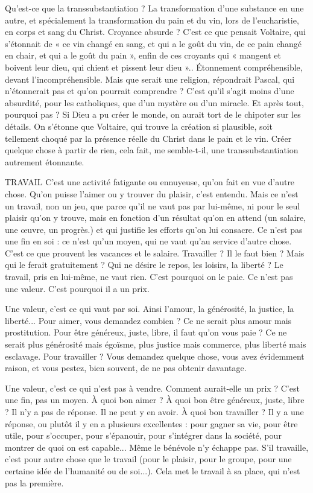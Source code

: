 Qu'est-ce que la transsubstantiation ? La transformation d’une substance
en une autre, et spécialement la transformation du pain et du vin, lors de
l'eucharistie, en corps et sang du Christ. Croyance absurde ? C’est ce que pensait
Voltaire, qui s’étonnait de « ce vin changé en sang, et qui a le goût du vin,
de ce pain changé en chair, et qui a le goût du pain », enfin de ces croyants qui
« mangent et boivent leur dieu, qui chient et pissent leur dieu ».. Étonnement
compréhensible, devant l’incompréhensible. Mais que serait une religion,
répondrait Pascal, qui n’étonnerait pas et qu’on pourrait comprendre ? C’est
qu'il s’agit moins d’une absurdité, pour les catholiques, que d’un mystère ou
d’un miracle. Et après tout, pourquoi pas ? Si Dieu a pu créer le monde, on
aurait tort de le chipoter sur les détails. On s’étonne que Voltaire, qui trouve la
création si plausible, soit tellement choqué par la présence réelle du Christ dans
le pain et le vin. Créer quelque chose à partir de rien, cela fait, me semble-t-il,
une transsubstantiation autrement étonnante.

TRAVAIL C’est une activité fatigante ou ennuyeuse, qu’on fait en vue d’autre
chose. Qu’on puisse l’aimer ou y trouver du plaisir, c’est entendu.
Mais ce n’est un travail, non un jeu, que parce qu’il ne vaut pas par lui-même,
ni pour le seul plaisir qu’on y trouve, mais en fonction d’un résultat qu’on en
attend (un salaire, une œuvre, un progrès.) et qui justifie les efforts qu’on lui
consacre. Ce n’est pas une fin en soi : ce n’est qu’un moyen, qui ne vaut qu’au
service d’autre chose. C’est ce que prouvent les vacances et le salaire.
Travailler ? Il le faut bien ? Mais qui le ferait gratuitement ? Qui ne désire le
repos, les loisirs, la liberté ? Le travail, pris en lui-même, ne vaut rien. C’est
pourquoi on le paie. Ce n’est pas une valeur. C’est pourquoi il a un prix.

Une valeur, c’est ce qui vaut par soi. Ainsi l’amour, la générosité, la justice,
la liberté... Pour aimer, vous demandez combien ? Ce ne serait plus amour
mais prostitution. Pour être généreux, juste, libre, il faut qu’on vous paie ? Ce
ne serait plus générosité mais égoïsme, plus justice mais commerce, plus liberté
mais esclavage. Pour travailler ? Vous demandez quelque chose, vous avez évidemment
raison, et vous pestez, bien souvent, de ne pas obtenir davantage.

Une valeur, c’est ce qui n’est pas à vendre. Comment aurait-elle un prix ?
C’est une fin, pas un moyen. À quoi bon aimer ? À quoi bon être généreux,
juste, libre ? Il n’y a pas de réponse. Il ne peut y en avoir. À quoi bon travailler ?
Il y a une réponse, ou plutôt il y en a plusieurs excellentes : pour gagner sa vie,
pour être utile, pour s'occuper, pour s’épanouir, pour s'intégrer dans la société,
pour montrer de quoi on est capable... Même le bénévole n’y échappe pas. S’il
travaille, c’est pour autre chose que le travail (pour le plaisir, pour le groupe,
pour une certaine idée de l'humanité ou de soi...). Cela met le travail à sa
place, qui n’est pas la première.

